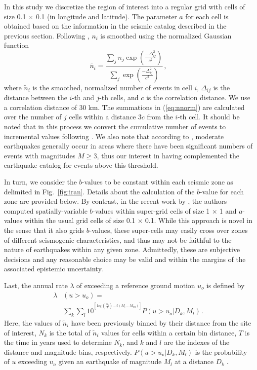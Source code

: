 In this study we discretize the region of interest into a regular grid with cells of size 0.1\textdegree{} $\times$ 0.1\textdegree{} (in longitude and latitude). The parameter $a$ for each cell is obtained based on the information in the seismic catalog described in the previous section. Following \citet{Frankel1995}, $n_i$ is smoothed using the normalized Gaussian function
% 
\begin{equation}
	\tilde{n_i} = \frac
		{ \sum_{j} n_{j} \exp ( \frac{ -\Delta_{ij}^{2} }{ c^2 } ) }
		{ \sum_{j} \exp ( \frac{ -\Delta_{ij}^{2} }{ c^2 } ) }
	\, ,
	\label{eq:nnorm}
\end{equation}
% 
where $\tilde{n}_i$ is the smoothed, normalized number of events in cell $i$, $\Delta_{ij}$ is the distance between the $i$-th and $j$-th cells, and $c$ is the correlation distance. We use a correlation distance of 30 km. The summations in (\ref{eq:nnorm}) are calculated over the number of $j$ cells within a distance $3c$ from the $i$-th cell. It should be noted that in this process we convert the cumulative number of events to incremental values following \citet{Herrmann1977}. We also note that according to \citet{Frankel1995}, moderate earthquakes generally occur in areas where there have been significant numbers of events with magnitudes $M \geq 3$, thus our interest in having complemented the earthquake catalog for events above this threshold.

In turn, we consider the $b$-values to be constant within each seismic zone as delimited in Fig.~\ref{fig:iran}. Details about the calculation of the $b$-value for each zone are provided below. By contrast, in the recent work by \citet{Khodaverdian_2016_BSSA}, the authors computed spatially-variable $b$-values within super-grid cells of size 1\textdegree{} $\times$ 1\textdegree{} and $a$-values within the usual grid cells of size 0.1\textdegree{} $\times$ 0.1\textdegree{}. While this approach is novel in the sense that it also grids $b$-values, these super-cells may easily cross over zones of different seismogenic characteristics, and thus may not be faithful to the nature of earthquakes within any given zone. Admittedly, these are subjective decisions and any reasonable choice may be valid and within the margins of the associated epistemic uncertainty.

Last, the annual rate $\lambda$ of exceeding a reference ground motion $u_o$ is defined by
% 
\begin{align}
	\lambda & \left( u > u_o \right) = \nonumber \\
		& \sum_{k} \sum_{l} 10^{ {}^{ \left[ \log \left( \frac{ N_{k} }{ T } \right) - b \left( M_l - M_{\mathrm{ref}} \right) \right] } }
		P \left( u > u_o | D_k , M_l \right)
		\, .
	\label{eq:exceed}
\end{align}
% 
Here, the values of $\tilde{n}_i$ have been previously binned by their distance from the site of interest, $N_k$ is the total of $\tilde{n}_i$ values for cells within a certain bin distance, $T$ is the time in years used to determine $N_k$, and $k$ and $l$ are the indexes of the distance and magnitude bins, respectively. $P ( u > u_o | D_k , M_l )$ is the probability of $u$ exceeding $u_o$ given an earthquake of magnitude $M_l$ at a distance $D_k$ \citep{Frankel1995}.

